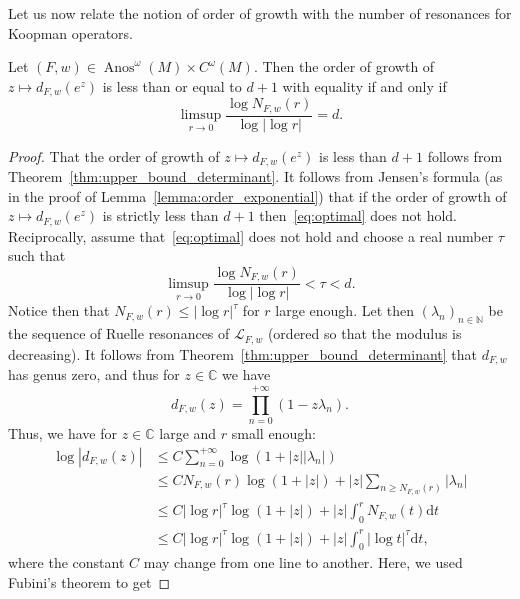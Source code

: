 \documentclass[AHL,Unicode,longabstracts,published]{cedram}
\DeclareMathOperator{\Anos}{Anos}
\newcommand{\clL}{\mathcal{L}}
\newcommand{\bbC}{\mathbb{C}}
\newcommand{\bbN}{\mathbb{N}}
\newcommand{\rmd}{\mathrm{d}}
\begin{document}
Let us now relate the notion of order of growth with the number of resonances for Koopman operators.

\begin{lemm}\label{lemma:optimal_order}
Let $(F,w) \in \Anos^\omega(M) \times C^\omega(M)$. Then the order of growth of $z \mapsto d_{F,w}(e^z)$ is less than or equal to $d+1$ with equality if and only if
\begin{equation}\label{eq:optimal}
\limsup_{r \to 0} \frac{\log N_{F,w}(r)}{\log |\log r|} = d.
\end{equation}
\end{lemm}

\begin{proof}
That the order of growth of $z \mapsto d_{F,w}(e^z)$ is less than $d+1$ follows from Theorem~\ref{thm:upper_bound_determinant}. It follows from Jensen's formula (as in the proof of Lemma~\ref{lemma:order_exponential}) that if the order of growth of $z \mapsto d_{F,w}(e^z)$ is strictly less than $d+1$ then~\eqref{eq:optimal} does not hold. Reciprocally, assume that~\eqref{eq:optimal} does not hold and choose a real number $\tau$ such that
\begin{equation*}
\limsup_{r \to 0} \frac{\log N_{F,w}(r)}{\log |\log r|} < \tau < d.
\end{equation*}
Notice then that $N_{F,w}(r) \leq |\log r|^\tau$ for $r$ large enough. Let then $(\lambda_n)_{n \in \bbN}$ be the sequence of Ruelle resonances of $\clL_{F,w}$ (ordered so that the modulus is decreasing). It follows from Theorem~\ref{thm:upper_bound_determinant} that $d_{F,w}$ has genus zero, and thus for $z \in \bbC$ we have
\begin{equation*}
d_{F,w}(z) = \prod_{n = 0}^{+ \infty} (1 - z \lambda_n).
\end{equation*}
Thus, we have for $z \in \bbC$ large and $r$ small enough:
\begin{equation*}
\begin{split}
\log |d_{F,w}(z)| & \leq C \sum_{n = 0}^{+ \infty} \log(1 + |z| |\lambda_n|) \\
& \leq C N_{F,w}(r) \log(1 + |z|) + |z| \sum_{n \geq N_{F,w}(r)}|\lambda_n| \\
& \leq C |\log r|^\tau \log(1 + |z|) + |z| \int_{0}^r N_{F,w}(t) \rmd t \\
& \leq C |\log r|^\tau \log(1 + |z|) + |z| \int_{0}^r |\log t|^\tau \rmd t,
\end{split}
\end{equation*}
where the constant $C$ may change from one line to another. Here, we used Fubini's theorem to get

\end{proof}
\end{document}
